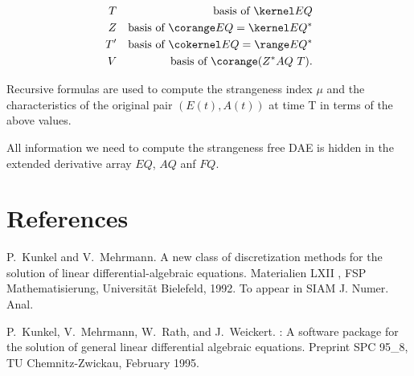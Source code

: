 \begin{eqnarray*}
    T &&\mbox {\rm basis of }\kernel EQ\\
    Z &&\mbox{\rm basis of }\corange EQ=\kernel EQ^* \\
    T' &&\mbox{\rm basis of }\cokernel EQ=\range EQ^*\\
    V &&\mbox{\rm basis of }\corange (Z^*AQ\ T).
\end{eqnarray*}

Recursive formulas are used to compute the strangeness index $\mu$ and
the characteristics of the original pair $(E(t), A(t))$ at time T in
terms of the above values.

All information we need to compute the strangeness free DAE is hidden
in the extended derivative array $EQ$, $AQ$ anf $FQ$.

\section{References}

\begin{thebibliography}{1}
P.~Kunkel and V.~Mehrmann.
\newblock A new class of discretization methods for the solution of linear
  differential-algebraic equations.
\newblock Materialien LXII , FSP Mathematisierung, Universit{\"a}t Bielefeld,
  1992.
\newblock To appear in SIAM J. Numer. Anal.

P.~Kunkel, V.~Mehrmann, W.~Rath, and J.~Weickert.
: A software package for the solution of general linear
  differential algebraic equations.
\newblock Preprint SPC 95\_8, TU Chemnitz-Zwickau, February 1995.

\end{thebibliography}





